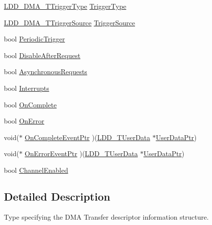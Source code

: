 \begin{DoxyCompactItemize}
\hyperlink{group___p_e___types__module_ga5590e47d6e7263ae9257e0d231c89521}{L\-D\-D\-\_\-\-D\-M\-A\-\_\-\-T\-Trigger\-Type} \hyperlink{struct_l_d_d___d_m_a___t_transfer_descriptor_a1d1ff275b5c883b0cad1b20ef1929716}{Trigger\-Type}
\item 
\hyperlink{group___p_e___types__module_ga8af21cbad27c8d061a98924a11fc5a9b}{L\-D\-D\-\_\-\-D\-M\-A\-\_\-\-T\-Trigger\-Source} \hyperlink{struct_l_d_d___d_m_a___t_transfer_descriptor_a770d0bde209b081eafe87892ed333084}{Trigger\-Source}
\item 
bool \hyperlink{struct_l_d_d___d_m_a___t_transfer_descriptor_aa29036eb34e794f3abbfea02be51711f}{Periodic\-Trigger}
\item 
bool \hyperlink{struct_l_d_d___d_m_a___t_transfer_descriptor_af47462df9934c927bd3cb1c8c7a4aa94}{Disable\-After\-Request}
\item 
bool \hyperlink{struct_l_d_d___d_m_a___t_transfer_descriptor_aca370900692e662cc4828e68e2c31f0a}{Asynchronous\-Requests}
\item 
bool \hyperlink{struct_l_d_d___d_m_a___t_transfer_descriptor_a2dd483b9c7608a34cc231114f2642271}{Interrupts}
\item 
bool \hyperlink{struct_l_d_d___d_m_a___t_transfer_descriptor_a1b9c560066718de0c2e9b5e0c6b2a3c5}{On\-Complete}
\item 
bool \hyperlink{struct_l_d_d___d_m_a___t_transfer_descriptor_a3ddeb9c7243015b0ee7afd15235ce37b}{On\-Error}
\item 
void($\ast$ \hyperlink{struct_l_d_d___d_m_a___t_transfer_descriptor_a1ffccd588bfb7555fb06c32e19f366cb}{On\-Complete\-Event\-Ptr} )(\hyperlink{group___p_e___types__module_ga0b66a73f87238a782318aa0be7578e35}{L\-D\-D\-\_\-\-T\-User\-Data} $\ast$\hyperlink{struct_l_d_d___d_m_a___t_transfer_descriptor_a4136d6742944c7b04a94695c78b581b8}{User\-Data\-Ptr})
\item 
void($\ast$ \hyperlink{struct_l_d_d___d_m_a___t_transfer_descriptor_a4104ee5800ba11d597e0481389fd674a}{On\-Error\-Event\-Ptr} )(\hyperlink{group___p_e___types__module_ga0b66a73f87238a782318aa0be7578e35}{L\-D\-D\-\_\-\-T\-User\-Data} $\ast$\hyperlink{struct_l_d_d___d_m_a___t_transfer_descriptor_a4136d6742944c7b04a94695c78b581b8}{User\-Data\-Ptr})
\item 
bool \hyperlink{struct_l_d_d___d_m_a___t_transfer_descriptor_acf5f8fe95f319b19a591880ed8a7a3c0}{Channel\-Enabled}
\end{DoxyCompactItemize}


\subsection{Detailed Description}
Type specifying the D\-M\-A Transfer descriptor information structure. 


